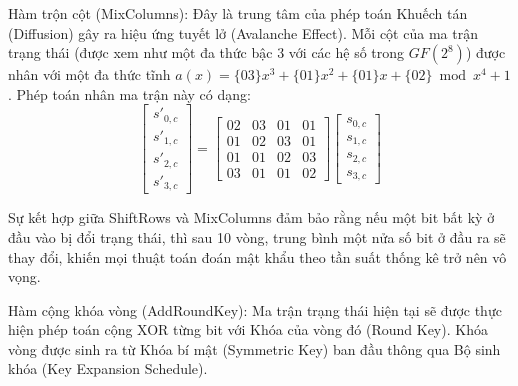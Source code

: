 Hàm trộn cột (MixColumns): Đây là trung tâm của phép toán Khuếch tán (Diffusion) gây ra hiệu ứng tuyết lở (Avalanche Effect). Mỗi cột của ma trận trạng thái (được xem như một đa thức bậc 3 với các hệ số trong $GF(2^8)$) được nhân với một đa thức tĩnh $a(x) = \{03\}x^3 + \{01\}x^2 + \{01\}x + \{02\} \bmod{x^4+1}$. Phép toán nhân ma trận này có dạng:
\begin{equation}
\begin{bmatrix}
s'_{0,c} \\
s'_{1,c} \\
s'_{2,c} \\
s'_{3,c}
\end{bmatrix}
=
\begin{bmatrix}
02 & 03 & 01 & 01 \\
01 & 02 & 03 & 01 \\
01 & 01 & 02 & 03 \\
03 & 01 & 01 & 02
\end{bmatrix}
\begin{bmatrix}
s_{0,c} \\
s_{1,c} \\
s_{2,c} \\
s_{3,c}
\end{bmatrix}
\end{equation}

Sự kết hợp giữa ShiftRows và MixColumns đảm bảo rằng nếu một bit bất kỳ ở đầu vào bị đổi trạng thái, thì sau 10 vòng, trung bình một nửa số bit ở đầu ra sẽ thay đổi, khiến mọi thuật toán đoán mật khẩu theo tần suất thống kê trở nên vô vọng.

Hàm cộng khóa vòng (AddRoundKey): Ma trận trạng thái hiện tại sẽ được thực hiện phép toán cộng XOR từng bit với Khóa của vòng đó (Round Key). Khóa vòng được sinh ra từ Khóa bí mật (Symmetric Key) ban đầu thông qua Bộ sinh khóa (Key Expansion Schedule).
 
